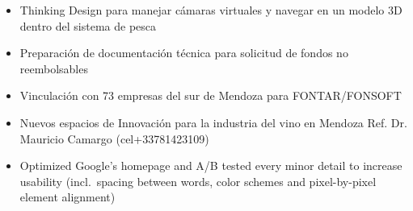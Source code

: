 \documentclass[10pt,a4paper,ragged2e,withhyper]{altacv}
\begin{document}
\begin{paracol}{2}


\begin{itemize}
\item  Thinking Design para manejar cámaras virtuales y navegar en un modelo 3D dentro del sistema de pesca

\end{itemize}

\divider

\begin{itemize}
\item Preparación de documentación técnica para solicitud de fondos no reembolsables
\item Vinculación con 73 empresas del sur de Mendoza para FONTAR/FONSOFT
\end{itemize}

\divider


\divider


\begin{itemize}
\item Nuevos espacios de Innovación para la industria del vino en Mendoza Ref.  Dr. Mauricio Camargo (cel+33781423109)
\item Optimized Google's homepage and A/B tested every minor detail to increase usability (incl.~spacing between words, color schemes and pixel-by-pixel element alignment)
\end{itemize}





\end{paracol}
\end{document}
